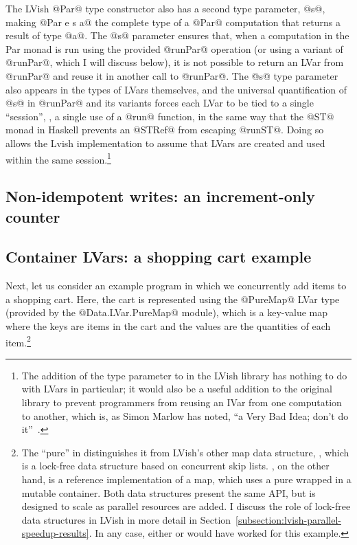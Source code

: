 The LVish @Par@ type constructor also has a second type parameter,
@s@, making @Par e s a@ the complete type of a @Par@ computation that
returns a result of type @a@.  The @s@ parameter ensures that, when a
computation in the Par monad is run using the provided @runPar@
operation (or using a variant of @runPar@, which I will discuss
below), it is not possible to return an LVar from @runPar@ and reuse
it in another call to @runPar@.  The @s@ type parameter also appears
in the types of LVars themselves, and the universal quantification of
@s@ in @runPar@ and its variants forces each LVar to be tied to a
single ``session'', \ie, a single use of a @run@ function, in the same
way that the @ST@ monad in Haskell prevents an @STRef@ from escaping
@runST@.  Doing so allows the Lvish implementation to assume that
LVars are created and used within the same session.\footnote{The
  addition of the  type parameter to  in the LVish
  library has nothing to do with LVars in particular; it would also be
  a useful addition to the original  library to prevent
  programmers from reusing an IVar from one  computation to
  another, which is, as Simon Marlow has noted, ``a Very Bad Idea;
  don't do it''~\cite{marlow-book}.}

\subsection{Non-idempotent writes: an increment-only counter}


\subsection{Container LVars: a shopping cart example}

Next, let us consider an example program in which we concurrently add
items to a shopping cart.  Here, the cart is represented using the
@PureMap@ LVar type (provided by the @Data.LVar.PureMap@ module),
which is a key-value map where the keys are items in the cart and the
values are the quantities of each item.\footnote{The ``pure'' in
   distinguishes it from LVish's other map data structure,
  , which is a lock-free data structure based on concurrent
  skip lists.  , on the other hand, is a reference
  implementation of a map, which uses a pure  wrapped in
  a mutable container.  Both data structures present the same API, but
   is designed to scale as parallel resources are added.  I
  discuss the role of lock-free data structures in LVish in more
  detail in Section~\ref{subsection:lvish-parallel-speedup-results}.
  In any case, either  or  would have worked for
  this example.}

